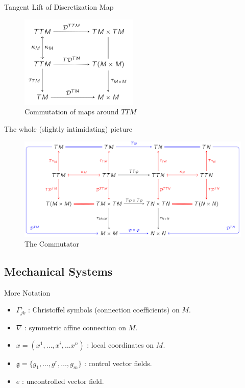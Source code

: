 \documentclass{beamer}
\begin{document}
\begin{frame}{Tangent Lift of Discretization Map}
  \begin{figure}[h]
    \centering
    \includegraphics[width=0.5\textwidth]{../Figures/double-tangent.png}
    \caption{Commutation of maps around $TTM$}
  \end{figure}
  
\end{frame}

\begin{frame}{The whole (slightly intimidating) picture}
  \begin{figure}
    \centering
    \includegraphics[width=\textwidth]{../Figures/double-commutator.png}
    \caption{The Commutator}
  \end{figure}
\end{frame}

\subsection{Mechanical Systems}

\begin{frame}{More Notation}

  \begin{itemize}
    \item $\Gamma^i_{jk}$ : Christoffel symbols (connection coefficients) on $M$.
    \item $\nabla$ : symmetric affine connection on $M$.
    \item $x = (x^1, \dots, x^i, \dots x^n)$ : local coordinates on $M$.
    \item $\mathfrak{g} = \{g_1,  \dots, g^r, \dots, g_m\}$ : control vector fields.
    \item $e$ : uncontrolled vector field.
  \end{itemize}
  
\end{frame}
\end{document}

